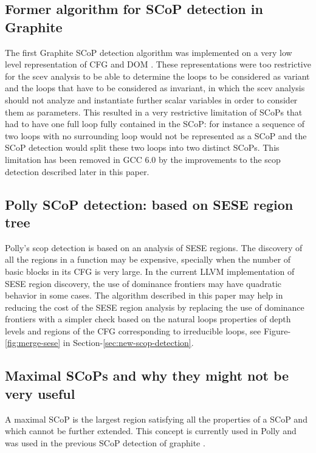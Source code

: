 \documentclass{sigplanconf}
\begin{document}
\subsection{Former algorithm for SCoP detection in Graphite}

The first Graphite SCoP detection algorithm was implemented on a very low level
representation of CFG and DOM \cite{trifunovic}.  These representations were
too restrictive for
the scev analysis to be able to determine the loops to be considered as variant
and the loops that have to be considered as invariant, in which the scev
analysis should not analyze and instantiate further scalar variables in order to
consider them as parameters.  This resulted in a very restrictive limitation of
SCoPs that had to have one full loop fully contained in the SCoP: for instance a
sequence of two loops with no surrounding loop would not be represented as a
SCoP and the SCoP detection would split these two loops into two distinct SCoPs.
This limitation has been removed in GCC 6.0 by the improvements to the scop
detection described later in this paper.

\subsection{Polly SCoP detection: based on SESE region tree}

Polly's scop detection is based on an analysis of SESE regions.  The discovery
of all the regions in a function may be expensive, specially when the number of
basic blocks in its CFG is very large.  In the current LLVM implementation of
SESE region discovery, the use of dominance frontiers may have quadratic
behavior in some cases.  The algorithm described in this paper may help in
reducing the cost of the SESE region analysis by replacing the use of dominance
frontiers with a simpler check based on the natural loops properties of depth
levels and regions of the CFG corresponding to irreducible loops, see
Figure-\ref{fig:merge-sese} in Section-\ref{sec:new-scop-detection}.

\subsection{Maximal SCoPs and why they might not be very useful}
\label{subsec:maximality}
A maximal SCoP is the largest region satisfying all the properties of a SCoP and
which cannot be further extended.  This concept is currently used in Polly
\cite{polly} and was used in the previous SCoP detection of graphite
\cite{graphite}.
\end{document}
